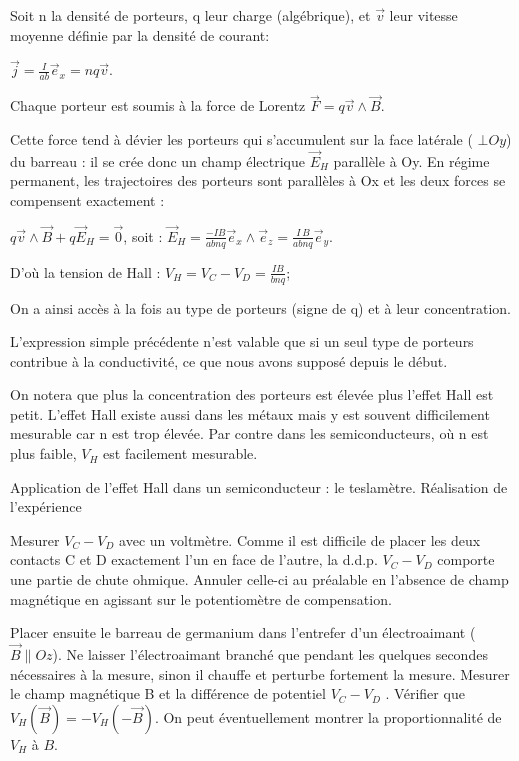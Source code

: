 \documentclass{article}%
\begin{document}
Soit n la densité de porteurs, q leur charge (algébrique), et $\vec{v}$ leur vitesse moyenne définie par la densité de courant:

$\vec{j} = \frac{\displaystyle I}{\displaystyle ab}\vec{e}_x = nq\vec{v}$.

Chaque porteur est soumis à la force de Lorentz $\vec{F} = q\vec{v}\wedge \vec{B}$.

Cette force tend à dévier les porteurs qui s'accumulent sur la face latérale ( $\bot Oy$) du barreau : il se crée donc un champ électrique $\vec{E}_{H}$ parallèle à Oy. En régime permanent, les trajectoires des porteurs sont parallèles à Ox et les deux forces se compensent exactement :

$q \vec{v}\wedge\vec{B} + q\vec{E}_{H} = \vec{0}$, soit :
$\vec{E}_{H} = \frac{\displaystyle - I B}{\displaystyle a b n q}\vec{e}_x \wedge \vec{e}_z = \frac{\displaystyle I\,B}{\displaystyle a b n q}\vec{e}_y$.

D'où la tension de Hall :
$V_{H} = V_{C} - V_{D} = \frac{\displaystyle I B}{\displaystyle b nq}$;

On a ainsi accès à la fois au type de porteurs (signe de q) et à leur concentration.

L'expression simple précédente n'est valable que si un seul type de porteurs contribue à la conductivité, ce que nous avons supposé depuis le début.

On notera que plus la concentration des porteurs est élevée plus l'effet Hall est petit. L'effet Hall existe aussi dans les métaux mais y est souvent difficilement mesurable car n est trop élevée. Par contre dans les semiconducteurs, où n est plus faible, $V_{H}$ est facilement mesurable.


Application de l'effet Hall dans un semiconducteur : le teslamètre.
Réalisation de l'expérience

Mesurer $V_{C} - V_{D}$ avec un voltmètre. Comme il est difficile de placer les deux contacts C et D exactement l'un en face de l'autre, la d.d.p. $V_{C} - V_{D}$ comporte une partie de chute ohmique. Annuler celle-ci au préalable en l'absence de champ magnétique en agissant sur le potentiomètre de compensation.

Placer ensuite le barreau de germanium dans l'entrefer d'un électroaimant ( $\vec{B} \parallel Oz$). Ne laisser l'électroaimant branché que pendant les quelques secondes nécessaires à la mesure, sinon il chauffe et perturbe fortement la mesure. Mesurer le champ magnétique B et la différence de potentiel $V_{C} - V_{D}$ . Vérifier que $V_{H} \left( \vec{B} \right) = - V_{H} \left( { - \vec{B}}\right)$. On peut éventuellement montrer la proportionnalité de $V_{H}$ à $B$.
\end{document}
